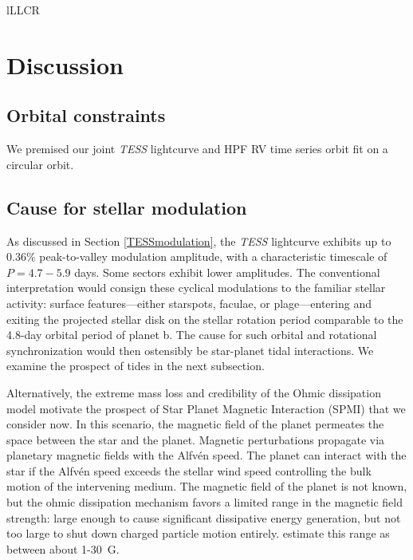 \documentclass[twocolumn]{aastex631}
\begin{document}
\begin{deluxetable}{lLLCR}
    \tablewidth{0pc}
    \tabletypesize{\scriptsize}
    \startdata
    
    \enddata
\end{deluxetable}

\section{Discussion}
\subsection{Orbital constraints}
We premised our joint \emph{TESS} lightcurve and HPF RV time series orbit fit on a circular orbit.

\subsection{Cause for stellar modulation}
As discussed in Section \ref{TESSmodulation}, the \emph{TESS} lightcurve exhibits up to $0.36\%$ peak-to-valley modulation amplitude, with a characteristic timescale of $P=4.7-5.9$ days. Some sectors exhibit lower amplitudes.  The conventional interpretation would consign these cyclical modulations to the familiar stellar activity: surface features---either starspots, faculae, or plage---entering and exiting the projected stellar disk on the stellar rotation period comparable to the 4.8-day orbital period of planet b.  The cause for such orbital and rotational synchronization would then ostensibly be star-planet tidal interactions.  We examine the prospect of tides in the next subsection.

Alternatively, the extreme mass loss and credibility of the Ohmic dissipation model motivate the prospect of Star Planet Magnetic Interaction (SPMI) that we consider now.  In this scenario, the magnetic field of the planet permeates the space between the star and the planet.  Magnetic perturbations propagate via planetary magnetic fields with the Alfv\'en speed.  The planet can interact with the star if the Alfv\'en speed exceeds the stellar wind speed controlling the bulk motion of the intervening medium.  The magnetic field of the planet is not known, but the ohmic dissipation mechanism favors a limited range in the magnetic field strength: large enough to cause significant dissipative energy generation, but not too large to shut down charged particle motion entirely.  \citet{2011ApJ...738....1B} estimate this range as between about 1-30~G.
\end{document}
